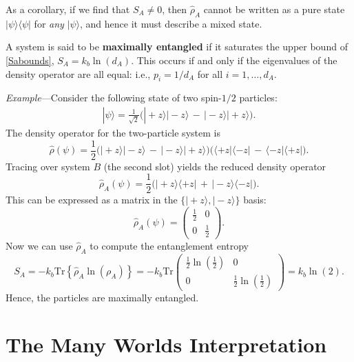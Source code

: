 \documentclass[pra,12pt]{revtex4}
\begin{document}
As a corollary, if we find that $S_{A} \ne 0$, then $\hat{\rho}_A$
cannot be written as a pure state $|\psi\rangle\langle\psi|$ for
\textit{any} $|\psi\rangle$, and hence it must describe a mixed state.

A system is said to be \textbf{maximally entangled} if it saturates
the upper bound of \eqref{Sabounds}, $S_A = k_b \ln(d_A)$.  This
occurs if and only if the eigenvalues of the density operator are all
equal: i.e., $p_i = 1/d_A$ for all $i = 1, \dots, d_A$.

\begin{framed}
\noindent
\textit{Example}---Consider the following state of two spin-$1/2$
particles:
\begin{align}
  |\psi\rangle = \frac{1}{\sqrt{2}} \Big(|\!+\!z\rangle|\!-\!z\rangle \,-\, |\!-\!z\rangle|\!+\!z\rangle\Big).
\end{align}
The density operator for the two-particle system is
\begin{equation}
  \hat{\rho}(\psi) = \frac{1}{2} \Big(|\!+\!z\rangle|\!-\!z\rangle \,-\, |\!-\!z\rangle|\!+\!z\rangle\Big) \Big(\langle+z|\langle-z| \,-\, \langle-z|\langle+z|\Big).
\end{equation}
Tracing over system $B$ (the second slot) yields the reduced density operator
\begin{equation}
  \hat{\rho}_A(\psi) = \frac{1}{2} \Big(|\!+\!z\rangle \langle+z| \,+\, |\!-\!z\rangle \langle-z|\Big).
\end{equation}
This can be expressed as a matrix in the
$\{|\!+z\rangle,|\!-z\rangle\}$ basis:
\begin{equation}
  \hat{\rho}_A(\psi) = \begin{pmatrix}\frac{1}{2} & 0 \\ 0 & \frac{1}{2}\end{pmatrix}.
\end{equation}
Now we can use $\hat{\rho}_A$ to compute the entanglement entropy
\begin{equation}
  S_A = -k_b\mathrm{Tr}\left\{\hat{\rho}_A\ln(\rho_A)\right\} = -k_b\mathrm{Tr}\begin{pmatrix}\frac{1}{2}\ln\left(\frac{1}{2}\right) & 0 \\ 0 & \frac{1}{2}\ln\left(\frac{1}{2}\right)\end{pmatrix} = k_b\ln(2).
\end{equation}
Hence, the particles are maximally entangled.
\end{framed}

\section{The Many Worlds Interpretation}
\end{document}
